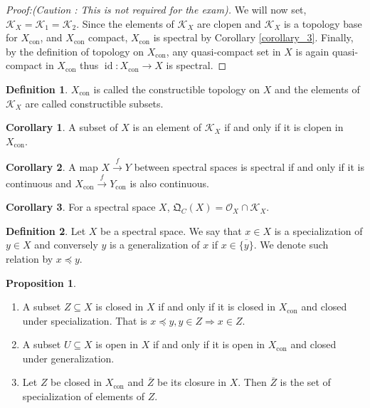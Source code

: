 \documentclass[10pt]{article}
\numberwithin{equation}{section}
\theoremstyle{definition}
\newtheorem{proposition}{Proposition}[subsection]
\newtheorem{definition}{Definition}[subsection]
\newtheorem{corollary}{Corollary} [subsection]
\DeclareMathOperator{\id}{id}
\DeclareMathOperator{\con}{con}
\newcommand{\Ouv}{\mathscr{O}}
\newcommand{\cK}[0]{\mathcal{K}}
\newcommand{\QC}[0]{\mathfrak{Q}_C}
\begin{document}
\begin{proof}[Proof:(Caution : This is not required for the exam)]
\par We will now set, $\cK_X=\cK_1=\cK_2$. Since the elements of $\cK_X$ are clopen and $\cK_X$ is a topology base for $X_{\con}$, and $X_{\con}$ compact, $X_{\con}$ is spectral by Corollary \ref{corollary_3}. Finally, by the definition of topology on $X_{\con}$, any quasi-compact set in $X$ is again quasi-compact in $X_{\con}$ thus $\id:X_{\con}\to X$ is spectral.
\end{proof}

\begin{definition}
    \label{definition_13}
    $X_{\con}$ is called the constructible topology on $X$ and the elements of $\cK_X$ are called constructible subsets.
\end{definition}
\begin{corollary}
    \label{corollary_4}
    A subset of $X$ is an element of $\cK_X$ if and only if it is clopen in $X_{\con}$.
\end{corollary}
\begin{corollary}
    A map $X\stackrel{f}{\to}Y$ between spectral spaces is spectral if and only if it is continuous and $X_{\con}\stackrel{f}{\to}Y_{\con}$ is also continuous.
\end{corollary}
\begin{corollary}
    \label{corollary_15}
    For a spectral space $X$, $\QC(X) = \Ouv_X\cap\cK_X$.
\end{corollary}
\begin{definition}
    \label{definition_14}
    Let $X$ be a spectral space. We say that $x\in X$ is a specialization of $y\in X$ and conversely $y$ is a generalization of $x$ if $x\in\overline{\{y\}}$. We denote such relation by $x\preceq y$.
\end{definition}
\begin{proposition}$\:$
    \label{proposition_6}
    \begin{enumerate}[1.]
    \item A subset $Z\subseteq X$ is closed in $X$ if and only if it is closed in $X_{\con}$ and closed under specialization. That is $x\preceq y,y\in Z\Rightarrow x\in Z$.
    \item A subset $U\subseteq X$ is open in $X$ if and only if it is open in $X_{\con}$ and closed under generalization.
    \item Let $Z$ be closed in $X_{\con}$ and $\overline{Z}$ be its closure in $X$. Then $\overline{Z}$ is the set of specialization of elements of $Z$.
\end{enumerate}
\end{proposition}
\end{document}
